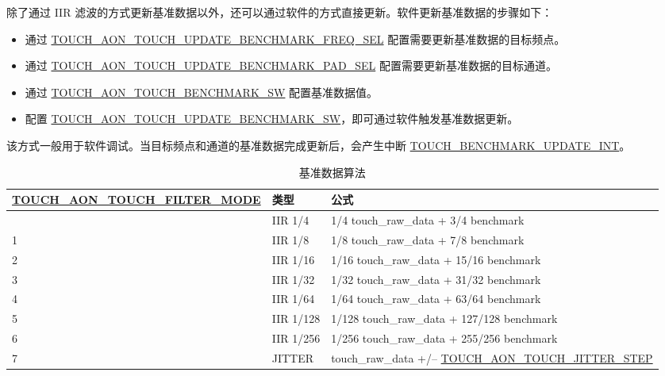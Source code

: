 \documentclass[main\_\_CN.tex]{subfiles}
\begin{document}
\begin{enumerate}
    除了通过 IIR 滤波的方式更新基准数据以外，还可以通过软件的方式直接更新。软件更新基准数据的步骤如下：
    \begin{itemize}
      \item 通过 \hyperref[fielddesc:TOUCHAONTOUCHUPDATEBENCHMARKFREQSEL]{TOUCH\_AON\_TOUCH\_UPDATE\_BENCHMARK\_FREQ\_SEL} 配置需要更新基准数据的目标频点。
      \item 通过 \hyperref[fielddesc:TOUCHAONTOUCHUPDATEBENCHMARKPADSEL]{TOUCH\_AON\_TOUCH\_UPDATE\_BENCHMARK\_PAD\_SEL} 配置需要更新基准数据的目标通道。
      \item 通过 \hyperref[fielddesc:TOUCHAONTOUCHBENCHMARKSW]{TOUCH\_AON\_TOUCH\_BENCHMARK\_SW} 配置基准数据值。
      \item 配置 \hyperref[fielddesc:TOUCHAONTOUCHUPDATEBENCHMARKSW]{TOUCH\_AON\_TOUCH\_UPDATE\_BENCHMARK\_SW}，即可通过软件触发基准数据更新。
    \end{itemize}
    该方式一般用于软件调试。当目标频点和通道的基准数据完成更新后，会产生中断 \hyperref[int:TOUCHBENCHMARKUPDATEINT]{TOUCH\_BENCHMARK\_UPDATE\_INT}。

\end{enumerate}

\begin{longtable}[c]{|p{5.8 cm}|p{1.5cm}|p{8.6cm}|}
    \caption{基准数据算法}\label{tab:benchmark-cal}\\
    \hline
    \rowcolor{lightgray}
    \textbf{\hyperref[fielddesc:TOUCHAONTOUCHFILTERMODE]{TOUCH\_AON\_TOUCH\_FILTER\_MODE}} & \textbf{类型} & \textbf{公式}\\ 
    \hline
    \endhead
    \endfoot
    \endlastfoot
    0  &  IIR 1/4 & 1/4 touch\_raw\_data + 3/4 benchmark \\\hline
    1  &  IIR 1/8 & 1/8 touch\_raw\_data + 7/8 benchmark \\\hline
    2  &  IIR 1/16 & 1/16 touch\_raw\_data + 15/16 benchmark \\\hline
    3  &  IIR 1/32 & 1/32 touch\_raw\_data + 31/32 benchmark \\\hline
    4  &  IIR 1/64 & 1/64 touch\_raw\_data + 63/64 benchmark \\\hline
    5  &  IIR 1/128 & 1/128 touch\_raw\_data + 127/128 benchmark \\\hline
    6  &  IIR 1/256 & 1/256 touch\_raw\_data + 255/256 benchmark \\\hline
    7  &  JITTER & touch\_raw\_data +/$–$ \hyperref[fielddesc:TOUCHAONTOUCHJITTERSTEP]{TOUCH\_AON\_TOUCH\_JITTER\_STEP} \\\hline
\end{longtable}
\end{document}
